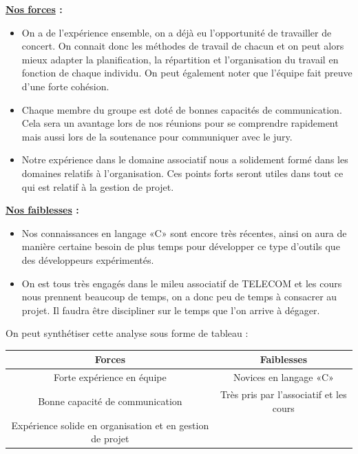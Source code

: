 \documentclass[a4paper, 12pt]{report}
\begin{document}
\textbf{\underline{Nos forces} :}
\begin{itemize}
    \item On a de l’expérience ensemble, on a déjà eu l'opportunité de travailler de concert. On connait donc les méthodes de travail de chacun et on peut alors mieux adapter la planification, la répartition et l'organisation du travail en fonction de chaque individu. On peut également noter que l'équipe fait preuve d'une forte cohésion.
    \item Chaque membre du groupe est doté de bonnes capacités de communication. Cela sera un avantage lors de nos réunions pour se comprendre rapidement mais aussi lors de la soutenance pour  communiquer avec le jury.
    \item Notre expérience dans le domaine associatif nous a solidement formé dans les domaines relatifs à l'organisation. Ces points forts seront utiles dans tout ce qui est relatif à la gestion de projet.
\end{itemize}
\bigskip

\textbf{\underline{Nos faiblesses} :}
\begin{itemize}
    \item Nos connaissances en langage «C» sont encore très récentes, ainsi on aura de manière certaine besoin de plus temps pour développer ce type d'outils que des développeurs expérimentés.
    \item On est tous très engagés dans le mileu associatif de TELECOM et les cours nous prennent beaucoup de temps, on a donc peu de temps à consacrer au projet.  Il faudra être discipliner sur le temps que l'on arrive à dégager.
\end{itemize}
\clearpage

On peut synthétiser cette analyse sous forme de tableau :

\begin{table}[htbp]
    \centering\begin{tabular}{|c|c|}
        \hline
        \textcolor{mainColor}{Forces}                             & \textcolor{mainColor}{Faiblesses}       \\
        \hline\hline
        Forte expérience en équipe                                & Novices en langage «C»                  \\
        \hline
        Bonne capacité de communication                           & Très pris par l'associatif et les cours \\
        \hline
        Expérience solide en organisation et en gestion de projet &                                         \\
        \hline
    \end{tabular}
\end{table}
\end{document}
